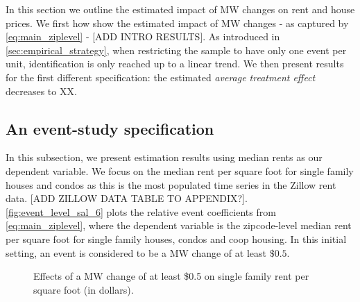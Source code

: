 
In this section we outline the estimated impact of MW changes on rent and house prices. We first how show the estimated impact of MW changes - as captured by \autoref{eq:main_ziplevel} - [ADD INTRO RESULTS]. As introduced in \autoref{sec:empirical_strategy}, when restricting the sample to have only one event per unit, identification is only reached up to a linear trend. We then present results for the first different specification: the estimated \textit{average treatment effect} decreases to XX. 

\subsection{An event-study specification}\label{subsec:results/event-study}

In this subsection, we present estimation results using median rents as our dependent variable. We focus on the median rent per square foot for single family houses and condos as this is the most populated time series in the Zillow rent data. [ADD ZILLOW DATA TABLE TO APPENDIX?]. \\

\autoref{fig:event_level_sal_6} plots the relative event coefficients from \autoref{eq:main_ziplevel}, where the dependent variable is the zipcode-level median rent per square foot for single family houses, condos and coop housing. In this initial setting, an event is considered to be a MW change of at least $\$0.5$.  

\begin{figure}[h!]
    \centering
    \caption{Effects of a MW change of at least \$0.5 on single family rent per square foot (in dollars).}
    \label{fig:event_level_sal_6}
\end{figure}

